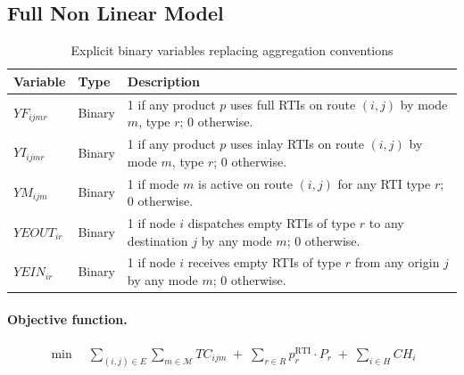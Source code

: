 \begin{ChapterAppendix}

\section{Full Non Linear Model}
\newcommand{\newcolor}{\color{blue}}


\begin{table}[ht]
\centering
\caption{Explicit binary variables replacing aggregation conventions}
\label{tab:new_variables}
\small
\begin{tabular}{|p{}|p{}|p{}|}
\hline
\textbf{Variable} & \textbf{Type} & \textbf{Description} \\ \hline
$YF_{ijmr}$ & Binary & 1 if any product $p$ uses full RTIs on route $(i,j)$ by mode $m$, type $r$; 0 otherwise. \\ \hline
$YI_{ijmr}$ & Binary & 1 if any product $p$ uses inlay RTIs on route $(i,j)$ by mode $m$, type $r$; 0 otherwise. \\ \hline
$YM_{ijm}$ & Binary & 1 if mode $m$ is active on route $(i,j)$ for any RTI type $r$; 0 otherwise. \\ \hline
$YEOUT_{ir}$ & Binary & 1 if node $i$ dispatches empty RTIs of type $r$ to any destination $j$ by any mode $m$; 0 otherwise. \\ \hline
$YEIN_{ir}$ & Binary & 1 if node $i$ receives empty RTIs of type $r$ from any origin $j$ by any mode $m$; 0 otherwise. \\ \hline
\end{tabular}
\end{table}


\paragraph{Objective function.}
\begin{align}
  \min \quad
  \sum_{(i,j)\in E} \sum_{m\in\mathcal{M}} TC_{ijm}
  \;+\;
  \sum_{r\in R} p^{\text{RTI}}_{r} \cdot P_{r}
  \;+\;
  \sum_{i\in H} CH_{i}
\end{align}


\end{ChapterAppendix}
